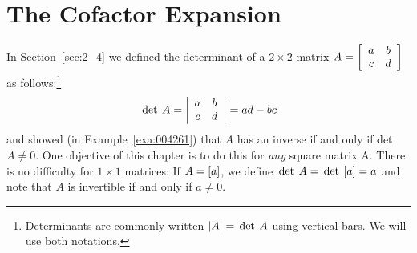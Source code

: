 \section{The Cofactor Expansion}
\label{sec:3_1}

In Section~\ref{sec:2_4} we defined the determinant of a $2 \times 2$ matrix
$A = \left[
\begin{array}{cc}
a & b \\
c & d
\end{array}
\right]$ 
 as follows:\footnote{Determinants are commonly written $|A| = \thinspace\operatorname{det \medspace} A$ using vertical bars. We will use both notations.}
\begin{equation*}
\thinspace\operatorname{det \medspace} A = \left| \begin{array}{cc}
a & b \\
c & d 
\end{array} \right|  = ad - bc
\end{equation*}
and showed (in Example~\ref{exa:004261}) that $A$ has an inverse if and only if det $A \neq 0$. One objective of this chapter is to do this for \textit{any} square matrix  A. There is no difficulty for $1 \times 1$ matrices: If $A = \left[ a \right]$, we define $\thinspace\operatorname{det\medspace} A = \thinspace\operatorname{det\medspace} \left[ a \right]  = a$ and note that $A$ is invertible if and only if $a \neq 0$.


